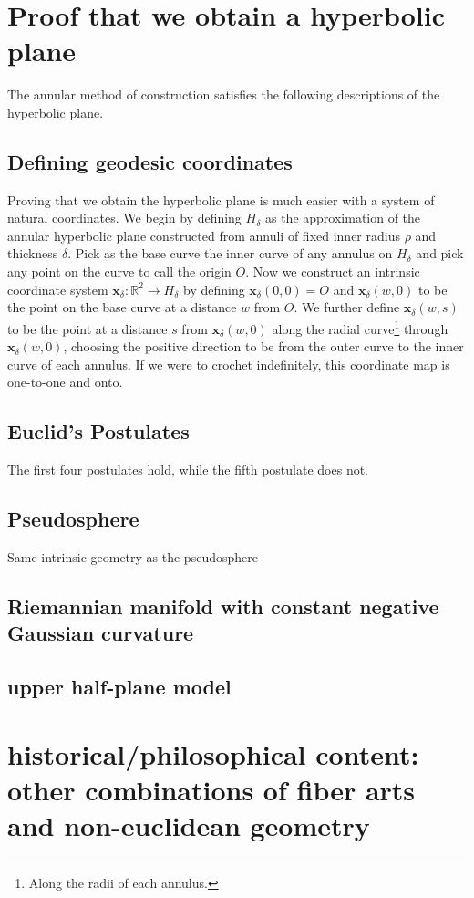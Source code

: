 \documentclass[letterpaper,titlepage]{article}
\begin{document}
\section{Proof that we obtain a hyperbolic plane}
The annular method of construction satisfies the following descriptions of the hyperbolic plane.
\subsection{Defining geodesic coordinates}
Proving that we obtain the hyperbolic plane is much easier with a system of natural coordinates.
We begin by defining $H_\delta$ as the approximation of the annular hyperbolic plane constructed from annuli of fixed inner radius $\rho$ and thickness $\delta$.
Pick as the base curve the inner curve of any annulus on $H_\delta$ and pick any point on the curve to call the origin $O$.
Now we construct an intrinsic coordinate system $\mathbf{x}_\delta : \mathbb{R}^2 \to H_\delta$ by defining $\mathbf{x}_\delta(0,0) = O$ and $\mathbf{x}_\delta(w,0)$ to be the point on the base curve at a distance $w$ from $O$.
We further define $\mathbf{x}_\delta(w,s)$ to be the point at a distance $s$ from $\mathbf{x}_\delta(w,0)$ along the radial curve\footnote{Along the radii of each annulus.} through $\mathbf{x}_\delta(w,0)$, choosing the positive direction to be from the outer curve to the inner curve of each annulus.
If we were to crochet indefinitely, this coordinate map is one-to-one and onto.


\subsection{Euclid's Postulates}
The first four postulates hold, while the fifth postulate does not.
\subsection{Pseudosphere}
Same intrinsic geometry as the pseudosphere
\subsection{Riemannian manifold with constant negative Gaussian curvature}
\subsection{upper half-plane model}

\section{historical/philosophical content: other combinations of fiber arts and non-euclidean geometry}
\end{document}

